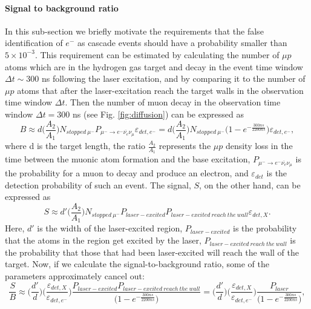 \documentclass[12pt]{article}
\begin{document}
\paragraph{Signal to background ratio}
In this sub-section we briefly motivate the requirements that the false identification of $e^-$ as cascade events should have a probability smaller than $5 \times 10^{-3}$. This requirement can be estimated by calculating the number of ${\mu}p$ atoms which are in the hydrogen gas target and decay in the event time window $\Delta{t} \sim 300$ ns following the laser excitation, and by comparing it to the number of $\mu{p}$ atoms that after the laser-excitation reach the target walls in the observation time window $\Delta{t}$. Then the number of muon decay in the observation time window $\Delta{t} = 300$ ns (see Fig. \ref{fig:diffusion}) can be expressed as
\begin{equation}
B \approx d \Big(\frac{A_2}{A_1}\Big)  N_{stopped\: {\mu}^-} P_{{\mu}^- \rightarrow {e^-}\overline{{\nu}_e}{\nu}_{\mu}} \varepsilon_{det, e^-} = d \Big(\frac{A_2}{A_1}\Big) N_{stopped\: {\mu}^-}  \Bigg(1 - e^{-\frac{300 ns}{2200 ns}}\Bigg) \varepsilon_{det,e^-},
\end{equation}
where d is the target length, the ratio $\frac{A_2}{A_1}$ represents the $\mu{p}$ density loss in the time between the muonic atom formation and the base excitation, $P_{{\mu}^- \rightarrow {e^-}\overline{{\nu}_e}{\nu}_{\mu}}$ is the probability for a muon to decay and produce an electron, and $\varepsilon_{det}$ is the detection probability of such an event. The signal, $S$, on the other hand, can be expressed as
\begin{equation}
S \approx d' \Big(\frac{A_2}{A_1}\Big) N_{stopped\: {\mu}^-} P_{laser-excited} P_{laser-excited\: reach\: the\: wall} \varepsilon_{det, X}.
\end{equation}
Here, $d'$ is the width of the laser-excited region, $P_{laser-excited}$ is the probability that the atoms in the region get excited by the laser, $P_{laser-excited\: reach\: the\: wall}$ is the probability that those that had been laser-excited will reach the wall of the target. Now, if we calculate the signal-to-background ratio, some of the parameters approximately cancel out:
\begin{equation}
\frac{S}{B} \approx \Big(\frac{d'}{d}\Big) \Big(\frac{\varepsilon_{det,X}}{\varepsilon_{det,e^-}}\Big) \frac{{P_{laser-excited}}{P_{laser-excited\: reach\: the\: wall}}}{ \Big(1 - e^{-\frac{300ns}{2200ns}}\Big)} = \Big(\frac{d'}{d}\Big)\Big(\frac{\varepsilon_{det,X}}{\varepsilon_{det,e^-}}\Big) \frac{P_{laser}}{\Big(1 - e^{-\frac{300ns}{2200ns}}\Big)},
\end{equation}
\end{document}
